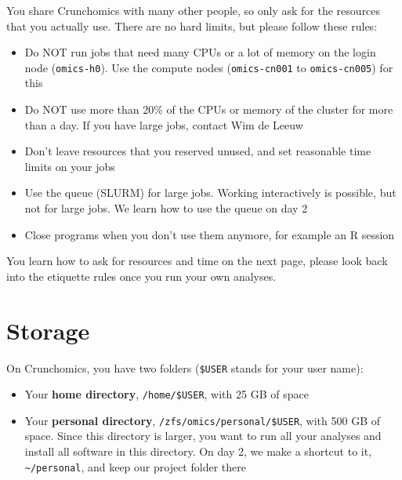 \documentclass[
  letterpaper,
  DIV=11,
  numbers=noendperiod]{scrreprt}
\providecommand{\tightlist}{%
  \setlength{\itemsep}{0pt}\setlength{\parskip}{0pt}}
\begin{document}
\begin{tcolorbox}[enhanced jigsaw, opacitybacktitle=0.6, breakable, colback=white, left=2mm, arc=.35mm, toptitle=1mm, colbacktitle=quarto-callout-important-color!10!white, title=\textcolor{quarto-callout-important-color}{\faExclamation}\hspace{0.5em}{Crunchomics etiquette}, rightrule=.15mm, toprule=.15mm, coltitle=black, colframe=quarto-callout-important-color-frame, bottomtitle=1mm, leftrule=.75mm, titlerule=0mm, opacityback=0, bottomrule=.15mm]

You share Crunchomics with many other people, so only ask for the
resources that you actually use. There are no hard limits, but please
follow these rules:

\begin{itemize}
\tightlist
\item
  Do NOT run jobs that need many CPUs or a lot of memory on the login
  node (\texttt{omics-h0}). Use the compute nodes (\texttt{omics-cn001}
  to \texttt{omics-cn005}) for this
\item
  Do NOT use more than 20\% of the CPUs or memory of the cluster for
  more than a day. If you have large jobs, contact Wim de Leeuw
\item
  Don't leave resources that you reserved unused, and set reasonable
  time limits on your jobs
\item
  Use the queue (SLURM) for large jobs. Working interactively is
  possible, but not for large jobs. We learn how to use the queue on day
  2
\item
  Close programs when you don't use them anymore, for example an R
  session
\end{itemize}

You learn how to ask for resources and time on the next page, please
look back into the etiquette rules once you run your own analyses.

\end{tcolorbox}

\section{Storage}\label{storage}

On Crunchomics, you have two folders (\texttt{\$USER} stands for your
user name):

\begin{itemize}
\tightlist
\item
  Your \textbf{home directory}, \texttt{/home/\$USER}, with 25 GB of
  space
\item
  Your \textbf{personal directory}, \texttt{/zfs/omics/personal/\$USER},
  with 500 GB of space. Since this directory is larger, you want to run
  all your analyses and install all software in this directory. On day
  2, we make a shortcut to it, \texttt{\textasciitilde{}/personal}, and
  keep our project folder there
\end{itemize}
\end{document}
